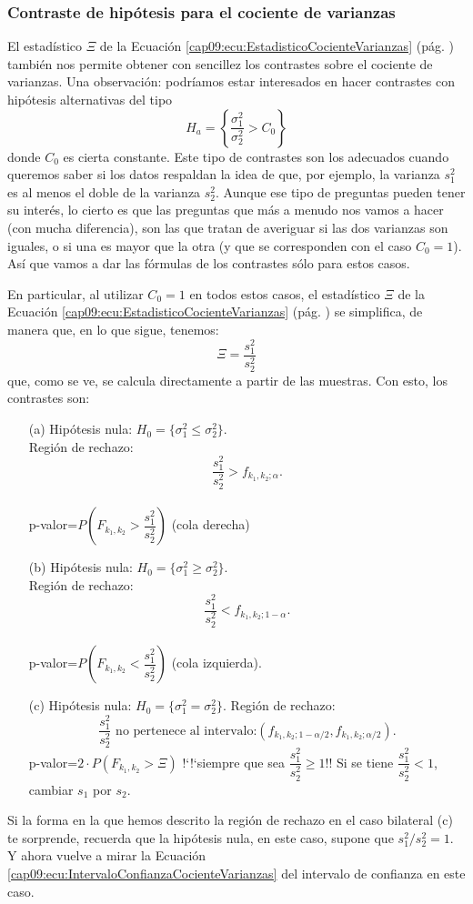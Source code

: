
\subsubsection{Contraste de hipótesis para el cociente de varianzas}
\label{cap09:subsec:ContrasteHipotesisCocienteVarianzas}

El estadístico $\Xi$ de la Ecuación \ref{cap09:ecu:EstadisticoCocienteVarianzas} (pág. \pageref{cap09:ecu:EstadisticoCocienteVarianzas}) también nos permite obtener con sencillez los contrastes sobre el cociente de varianzas. Una observación: podríamos estar interesados en hacer contrastes con hipótesis alternativas del tipo
\[H_a=\left\{\frac{\sigma_1^2}{\sigma_2^2}> C_0\right\}\]
donde $C_0$ es cierta constante. Este tipo de contrastes son los adecuados cuando queremos saber si los datos respaldan la idea de que, por ejemplo, la varianza $s_1^2$ es al menos el doble de la varianza $s_2^2$. Aunque ese tipo de preguntas pueden tener su interés, lo cierto es que las preguntas que más a menudo nos vamos a hacer (con mucha diferencia), son las que tratan de averiguar si las dos varianzas son iguales, o si una es mayor que la otra (y que se corresponden con el caso $C_0=1$). Así que vamos a dar las fórmulas de los contrastes sólo para estos casos.

En particular, al utilizar  $C_0=1$ en todos estos casos, el estadístico $\Xi$ de la Ecuación \ref{cap09:ecu:EstadisticoCocienteVarianzas} (pág. \pageref{cap09:ecu:EstadisticoCocienteVarianzas}) se simplifica, de manera que, en lo que sigue, tenemos:
\[\Xi=\dfrac{s_1^2}{s_2^2}\]
que, como se ve, se calcula directamente a partir de las muestras. Con esto, los contrastes son:
\begin{enumerate}
    \item[(a)] Hipótesis nula: $H_0=\{\sigma_1^2\leq \sigma_2^2\}$.\\
     Región de rechazo: \[\dfrac{s_1^2}{s_2^2}>f_{k_1,k_2;\alpha}.\]\\
     p-valor=$P\left(F_{k_1,k_2}>\dfrac{s_1^2}{s_2^2}\right)$ (cola derecha)
    \item[(b)] Hipótesis nula: $H_0=\{\sigma_1^2\geq \sigma_2^2\}$.\\
     Región de rechazo: \[\dfrac{s_1^2}{s_2^2}<f_{k_1,k_2;1-\alpha}.\]\\
     p-valor=$P\left(F_{k_1,k_2}<\dfrac{s_1^2}{s_2^2}\right)$ (cola izquierda).
    \item[(c)] Hipótesis nula: $H_0=\{\sigma_1^2=\sigma_2^2\}$. Región de rechazo:
    \[\dfrac{s_1^2}{s_2^2}\mbox{ no pertenece al intervalo:}
        \left(f_{k_1,k_2;1-\alpha/2},f_{k_1,k_2;\alpha/2}\right).\]
        p-valor=$2\cdot P\left(F_{k_1,k_2}>\Xi\right)$ {!`}{!`}siempre que sea $\dfrac{s_1^2}{s_2^2}\geq 1$!! Si se tiene $\dfrac{s_1^2}{s_2^2}<1$, cambiar $s_1$ por $s_2$.
\end{enumerate}
Si la forma en la que hemos descrito la región de rechazo en el caso bilateral (c) te sorprende, recuerda que la hipótesis nula, en este caso, supone que $s_1^2/s_2^2=1$. Y ahora vuelve a mirar la Ecuación \ref{cap09:ecu:IntervaloConfianzaCocienteVarianzas} del intervalo de confianza en este caso.


